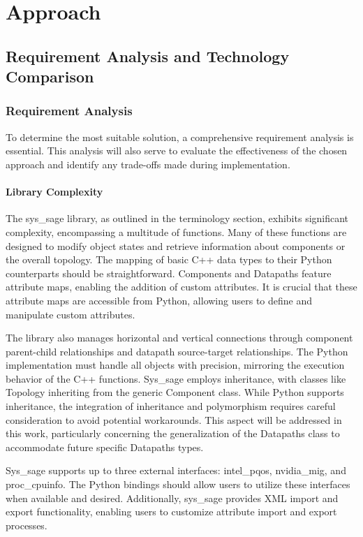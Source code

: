\chapter{Approach}\label{chapter:Approach}
\section{Requirement Analysis and Technology Comparison}

\subsection{Requirement Analysis}

To determine the most suitable solution, a comprehensive requirement analysis is essential. This analysis will also serve to evaluate the effectiveness of the chosen approach and identify any trade-offs made during implementation.

\subsubsection{Library Complexity}

The sys\_sage library, as outlined in the terminology section, exhibits significant complexity, encompassing a multitude of functions. Many of these functions are designed to modify object states and retrieve information about components or the overall topology. The mapping of basic C++ data types to their Python counterparts should be straightforward. Components and Datapaths feature attribute maps, enabling the addition of custom attributes. It is crucial that these attribute maps are accessible from Python, allowing users to define and manipulate custom attributes.

The library also manages horizontal and vertical connections through component parent-child relationships and datapath source-target relationships. The Python implementation must handle all objects with precision, mirroring the execution behavior of the C++ functions. Sys\_sage employs inheritance, with classes like Topology inheriting from the generic Component class. While Python supports inheritance, the integration of inheritance and polymorphism requires careful consideration to avoid potential workarounds. This aspect will be addressed in this work, particularly concerning the generalization of the Datapaths class to accommodate future specific Datapaths types.

Sys\_sage supports up to three external interfaces: intel\_pqos, nvidia\_mig, and proc\_cpuinfo. The Python bindings should allow users to utilize these interfaces when available and desired. Additionally, sys\_sage provides XML import and export functionality, enabling users to customize attribute import and export processes.

